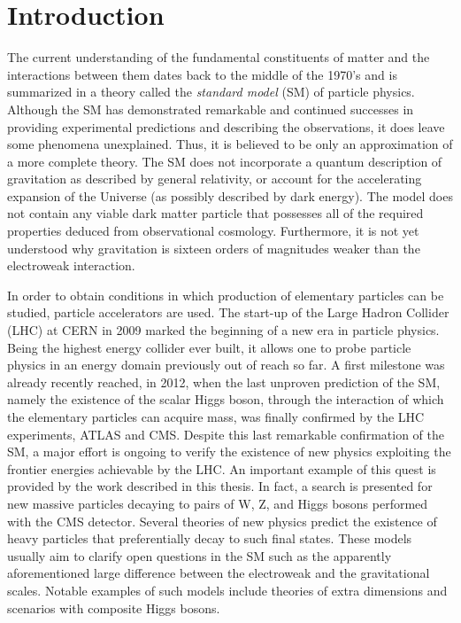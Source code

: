 \chapter{Introduction}
\label{ch:Introduction}

The current understanding of the fundamental constituents of matter and the interactions between them dates back to the middle of the 1970's and is summarized in a theory called the \textit{standard model} (SM) of particle physics. 
Although the SM has demonstrated remarkable and continued successes in providing experimental predictions and describing the observations, 
it does leave some phenomena unexplained. Thus, it is believed to be only an approximation of a more complete theory.
The SM does not incorporate a quantum description of gravitation as described by general relativity,
or account for the accelerating expansion of the Universe (as possibly described by dark energy).
The model does not contain any viable dark matter particle that possesses all of the required properties deduced from observational cosmology.
Furthermore, it is not yet understood why gravitation is sixteen orders of magnitudes weaker than the electroweak interaction. 

In order to obtain conditions in which production of elementary particles can be studied, particle accelerators are used.
The start-up of the Large Hadron Collider (LHC) at CERN in 2009 marked the beginning of a new era in particle physics.
Being the highest energy collider ever built, it allows one to probe particle physics in an energy domain previously out of reach so far.
A first milestone was already recently reached, in 2012, when the last unproven prediction of the SM, namely the existence of the scalar Higgs boson, through the interaction of which the elementary particles can acquire mass,
was finally confirmed by the LHC experiments, ATLAS and CMS.
Despite this last remarkable confirmation of the SM, a major effort is ongoing to verify the existence of new physics exploiting the frontier energies achievable by the LHC.
An important example of this quest is provided by the work described in this thesis. In fact, a search is presented for new massive particles decaying to pairs of W, Z, and Higgs bosons performed with the CMS detector.
Several theories of new physics predict the existence of heavy particles that preferentially decay to such final states.
These models usually aim to clarify open questions in the SM such as the apparently aforementioned large difference between the electroweak and the gravitational scales.
Notable examples of such models include theories of extra dimensions and scenarios with composite Higgs bosons.


